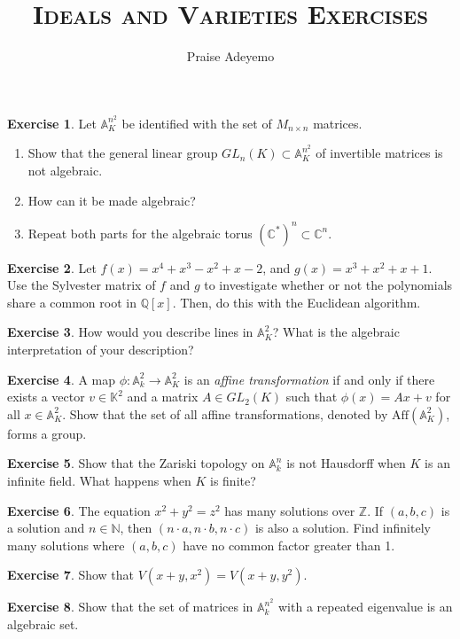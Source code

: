 \documentclass[12pt]{article}
\theoremstyle{definition}
\newtheorem{exercise}{Exercise}
\begin{document}
\title{\textsc{Ideals and Varieties Exercises}}
\author{Praise Adeyemo}

\maketitle

\thispagestyle{empty}

\begin{exercise} Let $\mathbb{A}_K^{n^2}$ be identified with the set of $M_{n \times n}$ matrices.
\begin{enumerate}
\item Show that the general linear group $GL_n(K) \subset \mathbb{A}_K^{n^2}$ of invertible matrices is not algebraic.
\item How can it be made algebraic?
\item Repeat both parts for the algebraic torus $(\mathbb{C}^*)^n \subset \mathbb{C}^n$.
\end{enumerate}
\end{exercise}

\begin{exercise}
Let $f(x)= x^4 + x^3 - x^2 + x - 2$, and $g(x) = x^3 + x^2 + x+1$. Use the Sylvester matrix of $f$ and $g$ to investigate whether or not the polynomials share a common root in $\mathbb{Q}[x]$. Then, do this with the Euclidean algorithm.
\end{exercise}

\begin{exercise} How would you describe lines in $\mathbb{A}_K^2$? What is the algebraic interpretation of your description?
\end{exercise}

\begin{exercise} A map $\phi : \mathbb{A}_k^2 \rightarrow \mathbb{A}_K^2$ is an \emph{affine transformation} if and only if there exists a vector $v \in \mathbb{K}^2$ and a matrix $A \in GL_2(K)$ such that $\phi(x) = Ax+v$ for all $x \in \mathbb{A}_K^2$. Show that the set of all affine transformations, denoted by $\text{Aff}(\mathbb{A}_K^2)$, forms a group.
\end{exercise}

\begin{exercise} Show that the Zariski topology on $\mathbb{A}_k^n$ is not Hausdorff when $K$ is an infinite field. What happens when $K$ is finite?
\end{exercise}

\begin{exercise} The equation $x^2+y^2 = z^2$ has many solutions over $\mathbb{Z}$. If $(a,b,c)$ is a solution and $n \in \mathbb{N}$, then $(n \cdot a, n \cdot b, n\cdot c)$ is also a solution. Find infinitely many solutions where $(a,b,c)$ have no common factor greater than 1.
\end{exercise}

\begin{exercise} Show that $V(x+y,x^2) = V(x+y,y^2)$. 
\end{exercise}

\begin{exercise} Show that the set of matrices in $\mathbb{A}_k^{n^2}$ with a repeated eigenvalue is an algebraic set.
\end{exercise}

\maketitle
\end{document}
